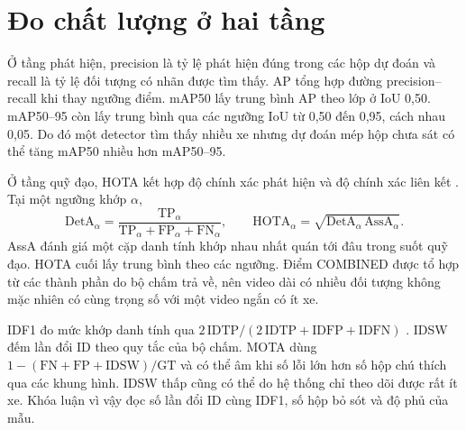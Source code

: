 \section{Đo chất lượng ở hai tầng}
Ở tầng phát hiện, precision là tỷ lệ phát hiện đúng trong các hộp dự đoán và recall là tỷ lệ đối tượng có nhãn được tìm thấy. AP tổng hợp đường precision--recall khi thay ngưỡng điểm. mAP50 lấy trung bình AP theo lớp ở IoU 0,50. mAP50--95 còn lấy trung bình qua các ngưỡng IoU từ 0,50 đến 0,95, cách nhau 0,05. Do đó một detector tìm thấy nhiều xe nhưng dự đoán mép hộp chưa sát có thể tăng mAP50 nhiều hơn mAP50--95.

Ở tầng quỹ đạo, HOTA kết hợp độ chính xác phát hiện và độ chính xác liên kết \cite{hota}. Tại một ngưỡng khớp $\alpha$,
\[
 \mathrm{DetA}_\alpha=\frac{\mathrm{TP}_\alpha}{\mathrm{TP}_\alpha+\mathrm{FP}_\alpha+\mathrm{FN}_\alpha},
 \qquad \mathrm{HOTA}_\alpha=\sqrt{\mathrm{DetA}_\alpha\,\mathrm{AssA}_\alpha}.
\]
AssA đánh giá một cặp danh tính khớp nhau nhất quán tới đâu trong suốt quỹ đạo. HOTA cuối lấy trung bình theo các ngưỡng. Điểm COMBINED được tổ hợp từ các thành phần do bộ chấm trả về, nên video dài có nhiều đối tượng không mặc nhiên có cùng trọng số với một video ngắn có ít xe.

IDF1 đo mức khớp danh tính qua $2\,\mathrm{IDTP}/(2\,\mathrm{IDTP}+\mathrm{IDFP}+\mathrm{IDFN})$ \cite{ristani}. IDSW đếm lần đổi ID theo quy tắc của bộ chấm. MOTA dùng $1-(\mathrm{FN}+\mathrm{FP}+\mathrm{IDSW})/\mathrm{GT}$ và có thể âm khi số lỗi lớn hơn số hộp chú thích qua các khung hình. IDSW thấp cũng có thể do hệ thống chỉ theo dõi được rất ít xe. Khóa luận vì vậy đọc số lần đổi ID cùng IDF1, số hộp bỏ sót và độ phủ của mẫu.
